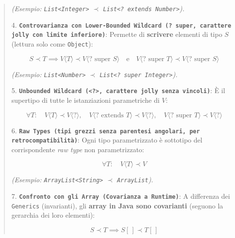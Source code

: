 \begin{quote}
   \emph{(Esempio: \texttt{List<Integer>} $\prec$ \texttt{List<? extends Number>}).}



4. \textbf{\texttt{Controvarianza con Lower-Bounded Wildcard (? super, carattere jolly con limite inferiore)}}: Permette di \textbf{scrivere} elementi di tipo $S$ (lettura solo come \texttt{Object}):



   \[

   S \prec T \implies V\langle T \rangle \prec V\langle ? \text{ super } S \rangle \quad \text{e} \quad V\langle ? \text{ super } T \rangle \prec V\langle ? \text{ super } S \rangle

\]



   \emph{(Esempio: \texttt{List<Number>} $\prec$ \texttt{List<? super Integer>}).}



5. \textbf{\texttt{Unbounded Wildcard (<?>, carattere jolly senza vincoli)}}: È il supertipo di tutte le istanziazioni parametriche di $V$:



   \[

   \forall T: \quad V\langle T \rangle \prec V\langle ? \rangle, \quad V\langle ? \text{ extends } T \rangle \prec V\langle ? \rangle, \quad V\langle ? \text{ super } T \rangle \prec V\langle ? \rangle

\]



6. \textbf{\texttt{Raw Types (tipi grezzi senza parentesi angolari, per retrocompatibilità)}}: Ogni tipo parametrizzato è sottotipo del corrispondente \emph{raw type} non parametrizzato:



   \[

   \forall T: \quad V\langle T \rangle \prec V

\]



   \emph{(Esempio: \texttt{ArrayList<String>} $\prec$ \texttt{ArrayList}).}



7. \textbf{\texttt{Confronto con gli Array (Covarianza a Runtime)}}: A differenza dei \texttt{Generics} (invarianti), gli \textbf{array in Java sono covarianti} (seguono la gerarchia dei loro elementi):



   \[

   S \prec T \implies S[\,] \prec T[\,]

\]
\end{quote}
